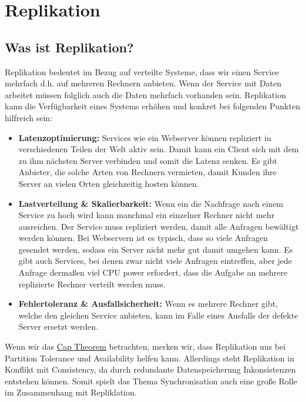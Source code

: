 \section{Replikation}

\subsection{Was ist Replikation?}

Replikation bedeutet im Bezug auf verteilte Systeme, dass wir einen Service mehrfach d.h. auf mehreren Rechnern anbieten. Wenn der Service mit Daten arbeitet müssen folglich auch die Daten mehrfach vorhanden sein. Replikation kann die Verfügbarkeit eines Systems erhöhen und konkret bei folgenden Punkten hilfreich sein:

\begin{itemize}
    \item \textbf{Latenzoptimierung:} Services wie ein Webserver können repliziert in verschiedenen Teilen der Welt aktiv sein. Damit kann ein Client sich mit dem zu ihm nächsten Server verbinden und somit die Latenz senken. Es gibt Anbieter, die solche Arten von Rechnern vermieten, damit Kunden ihre Server an vielen Orten gleichzeitig hosten können.
    \item \textbf{Lastverteilung \& Skalierbarkeit:} Wenn ein die Nachfrage nach einem Service zu hoch wird kann manchmal ein einzelner Rechner nicht mehr ausreichen. Der Service muss repliziert werden, damit alle Anfragen bewältigt werden können. Bei Webservern ist es typisch, dass so viele Anfragen gesendet werden, sodass ein Server nicht mehr gut damit umgehen kann. Es gibt auch Services, bei denen zwar nicht viele Anfragen eintreffen, aber jede Anfrage dermaßen viel CPU power erfordert, dass die Aufgabe an mehrere replizierte Rechner verteilt werden muss.
    \item \textbf{Fehlertoleranz \& Ausfallsicherheit:} Wenn es mehrere Rechner gibt, welche den gleichen Service anbieten, kann im Falle eines Ausfalls der defekte Server ersetzt werden.
\end{itemize}


Wenn wir das \hyperref[sec:CAP_Theorem]{Cap Theorem} betrachten, merken wir, dass Replikation uns bei Partition Tolerance und Availability helfen kann. Allerdings steht Replikation in Konflikt mit Consistency, da durch redundante Datenspeicherung Inkonsistenzen entstehen können. Somit spielt das Thema Synchronisation auch eine große Rolle im Zusammenhang mit Repliklation.

